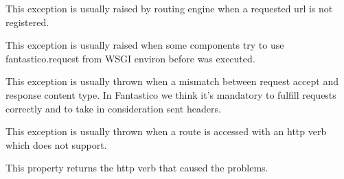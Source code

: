 \documentclass[letterpaper,10pt,english]{sphinxmanual}
\begin{document}

\begin{fulllineitems}
\label{features/exceptions:fantastico.exceptions.FantasticoRouteNotFoundError}
This exception is usually raised by routing engine when a requested url is not registered.

\end{fulllineitems}


\begin{fulllineitems}
\label{features/exceptions:fantastico.exceptions.FantasticoNoRequestError}
This exception is usually raised when some components try to use fantastico.request from WSGI environ before 
{\hyperref[features/request_response:fantastico.middleware.request_middleware.RequestMiddleware]{}} was executed.

\end{fulllineitems}


\begin{fulllineitems}
\label{features/exceptions:fantastico.exceptions.FantasticoContentTypeError}
This exception is usually thrown when a mismatch between request accept and response content type. In
Fantastico we think it's mandatory to fulfill requests correctly and to take in consideration sent headers.

\end{fulllineitems}


\begin{fulllineitems}
\label{features/exceptions:fantastico.exceptions.FantasticoHttpVerbNotSupported}
This exception is usually thrown when a route is accessed with an http verb which does not support.

\begin{fulllineitems}
\label{features/exceptions:fantastico.exceptions.FantasticoHttpVerbNotSupported.http_verb}
This property returns the http verb that caused the problems.

\end{fulllineitems}


\end{fulllineitems}
\end{document}
